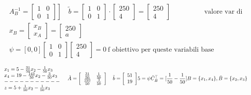 {$$
\begin{aligned}
        & \left.A_B^{-1}=\left[\begin{array}{ll}1 & 0 \\
        0 & 1\end{array}\right]\right] \quad \tilde{b}=\left[\begin{array}{ll}1 & 0 \\
        0 & 1\end{array}\right] \cdot\left[\begin{array}{c}250 \\
        4\end{array}\right]=\left[\begin{array}{c}250 \\
        4\end{array}\right] & \text{valore var di base} \\
        & x_B=\left[\begin{array}{l}x_B \\
        x_A\end{array}\right]=\left[\begin{array}{c}250 \\
        a\end{array}\right] \\
        & \psi=[0,0]\left[\begin{array}{ll}1 & 0 \\
        0 & 1\end{array}\right]\left[\begin{array}{c}250 \\
        4\end{array}\right]=0\ {\text {f obiettivo per queste variabili base}} 
        \end{aligned}
$$

\[
\begin{aligned}
    \begin{array}{l}
        x_{1}=5-\frac{31}{50} x_{2}-\frac{1}{50} x_{3} \\
        x_{4}=19-\frac{143}{50} x_{2}-\frac{3}{50} x_{3} \\
        -----------\\
        z=5+\frac{1}{50} x_{2}-\frac{1}{50} x_{3}
        \end{array} \quad 
        \tilde{A}=
        \left[\begin{array}{cc}
        \frac{31}{50} & \frac{1}{50} \\
        \frac{193}{50} & \frac{3}{50}
        \end{array}\right] 
        \quad \tilde{b}=\left[
        \begin{array}{l}51 \\
        19\end{array}\right] 
        \end{aligned}\\
        5=\psi \\ 
        \tilde{C}_{\bar{B}}^{\top}=[\frac{1}{50}-\frac{1}{50}]\\
        B=\{x_1,x_4\}, \bar{B}=\{x_2,x_3\}\\
\]


}
